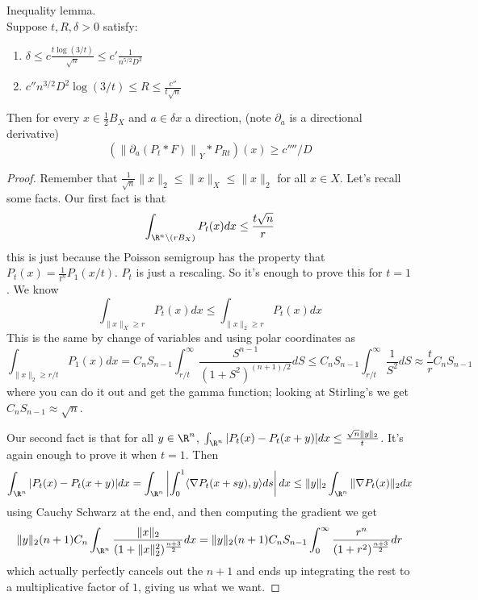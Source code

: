 \begin{lem} Inequality lemma. \\
Suppose $t, R, \delta > 0$ satisfy: 
\begin{enumerate}

\item $\delta \leq c \frac{t\log(3/t)}{\sqrt{n}} \leq c' \frac{1}{n^{5/2}D^2}$

\item $c'' n^{3/2}D^2 \log(3/t) \leq R \leq \frac{c''}{t\sqrt{n}}$

\end{enumerate}
Then for every $x \in \frac{1}{2}B_X$ and $a \in \delta x$ a direction, (note $\partial_a$ is a directional derivative) 
\[
\left(\left\|\partial_a(P_t*F)\right\|_Y * P_{Rt}\right)(x) \ge c''''/D
\]
\end{lem}
\begin{proof}

Remember that $\frac{1}{\sqrt{n}}\|x\|_2 \leq \|x\|_X \leq \|x\|_2$ for all $x \in X$. 
Let's recall some facts. Our first fact is that 
\[
\int_{\R^n \setminus (rB_X)} P_t(x)dx \leq \frac{t\sqrt{n}}{r}
\]
this is just because the Poisson semigroup has the property that $P_t(x) = \frac{1}{t^n}P_1(x/t)$. $P_t$ is just a rescaling. So it's enough to prove this for $t = 1$. We know 
\[
\int_{\|x\|_X \geq r} P_t(x)dx \leq \int_{\|x\|_2 \geq r} P_t(x) dx
\]
This is the same by change of variables and using polar coordinates as  
\[
\int_{\|x\|_2 \geq r/t} P_1(x)dx = C_n S_{n - 1} \int_{r/t}^{\infty} \frac{S^{n - 1}}{(1 + S^2)^{(n + 1)/2}} dS \leq C_nS_{n - 1} \int_{r/t}^{\infty} \frac{1}{S^2} dS \approx \frac{t}{r}C_nS_{n - 1}
\]
where you can do it out and get the gamma function; looking at Stirling's we get $C_n S_{n -1} \approx \sqrt{n}$. 

Our second fact is that for all $y \in \R^n$, $\int_{\R^n} |P_t(x) - P_t(x + y)| dx \le \frac{\sqrt{n}\|y\|_2}{t}$. It's again enough to prove it when $t = 1$. 
Then 
\[
\int_{\R^n} |P_t(x) - P_t(x + y)| dx = \int_{\R^n} \left| \int_{0}^1 \langle \nabla P_t(x + sy), y \rangle ds\right| dx \leq \|y\|_2 \int_{\R^n} \|\nabla P_t(x)\|_2 dx
\]
using Cauchy Schwarz at the end, and then computing the gradient we get 
\[
\|y\|_2(n + 1)C_n\int_{\R^n} \frac{\|x\|_2}{(1 + \|x\|_2^2)^{\frac{n + 3}{2}}} dx = \|y\|_2 (n + 1)C_n S_{n - 1} \int_{0}^{\infty} \frac{r^n}{(1 + r^2)^{\frac{n + 3}{2}}} dr 
\]
which actually perfectly cancels out the $n + 1$ and ends up integrating the rest to a multiplicative factor of $1$, giving us what we want. 


\end{proof}
